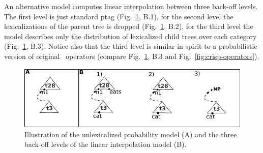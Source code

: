 An alternative model computes linear interpolation between three back-off levels. The first level is just standard {\sc ptag} (Fig.~\ref{fig:modelillustration}, B.1), for the second level the lexicalizations of the parent tree is dropped (Fig.~\ref{fig:modelillustration}, B.2), for the third level the model describes only the distribution of lexicalized child trees over each category (Fig.~\ref{fig:modelillustration}, B.3).  
Notice also that the third level is similar in spirit to a probabilistic version of original \crisp\ operators (compare Fig.~\ref{fig:modelillustration}, B.3 and Fig.~\ref{fig:crisp-operators}). 
\begin{figure}[t]
\begin{center}
\includegraphics[width=.5\textwidth]{figures/modelillustration}
\caption{\label{fig:modelillustration} Illustration of the unlexicalized probability model (A) and the three back-off levels of the linear interpolation model (B).}

\end{center}
\end{figure}










